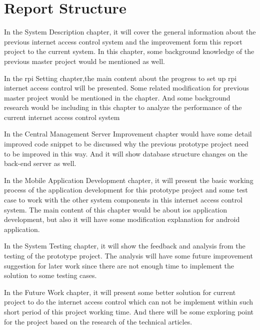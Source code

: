 \section{Report Structure}
\par In the System Description chapter, it will cover the general information about the previous internet access control system and the improvement form this report project to the current system. In this chapter, some background knowledge of the previous master project\cite{TorgeirMR} would be mentioned as well.
\par In the \gls{rpi} Setting chapter,the main content about the progress to set up \gls{rpi} internet access control will be presented. Some related modification for previous master project would be mentioned in the chapter. And some background research would be including in this chapter to analyze the performance of the current internet access control system
\par In the Central Management Server Improvement chapter would have some detail improved code snippet to be discussed why the previous prototype project need to be improved in this way. And it will show database structure changes on the back-end server as well.
\par In the Mobile Application Development chapter, it will present the basic working process of the application development for this prototype project and some test case to work with the other system components in this internet access control system. The main content of this chapter would be about \gls{ios} application development, but also it will have some modification explanation for android application.
\par In the System Testing chapter, it will show the feedback and analysis from the testing of the prototype project. The analysis will have some future improvement suggestion for later work since there are not enough time to implement the solution to some testing cases.
\par In the Future Work chapter, it will present some better solution for current project to do the internet access control which can not be implement within such short period of this project working time. And there will be some exploring point for the project based on the research of the technical articles.